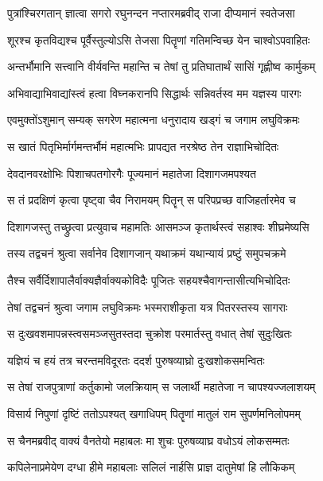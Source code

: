 
\twolineshloka
{पुत्रांश्चिरगतान् ज्ञात्वा सगरो रघुनन्दन}
{नप्तारमब्रवीद् राजा दीप्यमानं स्वतेजसा} %

\twolineshloka
{शूरश्च कृतविद्यश्च पूर्वैस्तुल्योऽसि तेजसा}
{पितॄणां गतिमन्विच्छ येन चाश्वोऽपवाहितः} %

\twolineshloka
{अन्तर्भौमानि सत्त्वानि वीर्यवन्ति महान्ति च}
{तेषां तु प्रतिघातार्थं सासिं गृह्णीष्व कार्मुकम्} %

\twolineshloka
{अभिवाद्याभिवाद्यांस्त्वं हत्वा विघ्नकरानपि}
{सिद्धार्थः सन्निवर्तस्व मम यज्ञस्य पारगः} %

\twolineshloka
{एवमुक्तोंऽशुमान् सम्यक् सगरेण महात्मना}
{धनुरादाय खड्गं च जगाम लघुविक्रमः} %

\twolineshloka
{स खातं पितृभिर्मार्गमन्तर्भौमं महात्मभिः}
{प्रापद्यत नरश्रेष्ठ तेन राज्ञाभिचोदितः} %

\twolineshloka
{देवदानवरक्षोभिः पिशाचपतगोरगैः}
{पूज्यमानं महातेजा दिशागजमपश्यत} %

\twolineshloka
{स तं प्रदक्षिणं कृत्वा पृष्ट्वा चैव निरामयम्}
{पितॄन् स परिपप्रच्छ वाजिहर्तारमेव च} %

\twolineshloka
{दिशागजस्तु तच्छ्रुत्वा प्रत्युवाच महामतिः}
{आसमञ्ज कृतार्थस्त्वं सहाश्वः शीघ्रमेष्यसि} %

\twolineshloka
{तस्य तद्वचनं श्रुत्वा सर्वानेव दिशागजान्}
{यथाक्रमं यथान्यायं प्रष्टुं समुपचक्रमे} %

\twolineshloka
{तैश्च सर्वैर्दिशापालैर्वाक्यज्ञैर्वाक्यकोविदैः}
{पूजितः सहयश्चैवागन्तासीत्यभिचोदितः} %

\twolineshloka
{तेषां तद्वचनं श्रुत्वा जगाम लघुविक्रमः}
{भस्मराशीकृता यत्र पितरस्तस्य सागराः} %

\twolineshloka
{स दुःखवशमापन्नस्त्वसमञ्जसुतस्तदा}
{चुक्रोश परमार्तस्तु वधात् तेषां सुदुःखितः} %

\twolineshloka
{यज्ञियं च हयं तत्र चरन्तमविदूरतः}
{ददर्श पुरुषव्याघ्रो दुःखशोकसमन्वितः} %

\twolineshloka
{स तेषां राजपुत्राणां कर्तुकामो जलक्रियाम्}
{स जलार्थी महातेजा न चापश्यज्जलाशयम्} %

\twolineshloka
{विसार्य निपुणां दृष्टिं ततोऽपश्यत् खगाधिपम्}
{पितॄणां मातुलं राम सुपर्णमनिलोपमम्} %

\twolineshloka
{स चैनमब्रवीद् वाक्यं वैनतेयो महाबलः}
{मा शुचः पुरुषव्याघ्र वधोऽयं लोकसम्मतः} %

\twolineshloka
{कपिलेनाप्रमेयेण दग्धा हीमे महाबलाः}
{सलिलं नार्हसि प्राज्ञ दातुमेषां हि लौकिकम्} %

